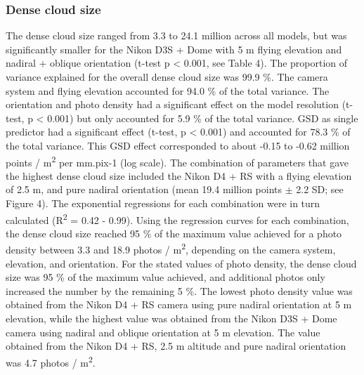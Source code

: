 \subsubsection{Dense cloud size}\label{chapitre1_3.1.2}
The dense cloud size ranged from 3.3 to 24.1 million across all models, but was significantly smaller for the Nikon D3S + Dome with 5 m flying elevation and nadiral + oblique orientation (t-test p < 0.001, see Table 4). The proportion of variance explained for the overall dense cloud size was 99.9 \%. The camera system and flying elevation accounted for 94.0 \% of the total variance. The orientation and photo density had a significant effect on the model resolution (t-test, p < 0.001) but only accounted for 5.9 \% of the total variance. GSD as single predictor had a significant effect (t-test, p < 0.001) and accounted for 78.3 \% of the total variance. This GSD effect corresponded to about -0.15 to -0.62 million points / m\textsuperscript{2} per mm.pix-1 (log scale). The combination of parameters that gave the highest dense cloud size included the Nikon D4 + RS with a flying elevation of 2.5 m, and pure nadiral orientation (mean 19.4 million points $\pm$ 2.2 SD; see Figure 4).
\medskip
The exponential regressions for each combination were in turn calculated (R\textsuperscript{2} = 0.42 - 0.99). Using the regression curves for each combination, the dense cloud size reached 95 \% of the maximum value achieved for a photo density between 3.3 and 18.9 photos / m\textsuperscript{2}, depending on the camera system, elevation, and orientation. For the stated values of photo density, the dense cloud size was 95 \% of the maximum value achieved, and additional photos only increased the number by the remaining 5 \%. The lowest photo density value was obtained from the Nikon D4 + RS camera using pure nadiral orientation at 5 m elevation, while the highest value was obtained from the Nikon D3S + Dome camera using nadiral and oblique orientation at 5 m elevation. The value obtained from the Nikon D4 + RS, 2.5 m altitude and pure nadiral orientation was 4.7 photos / m\textsuperscript{2}.

